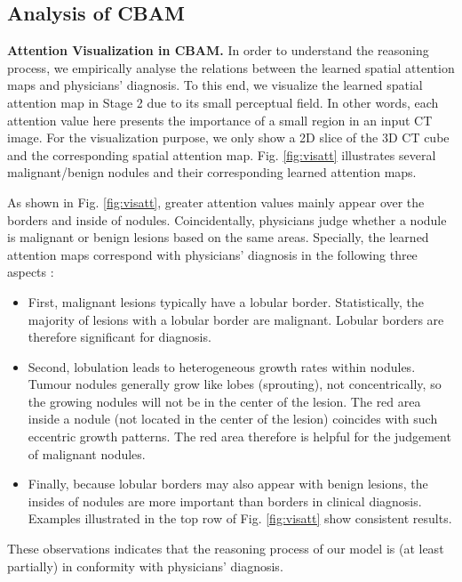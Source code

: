 \documentclass[final,5p,times,twocolumn]{elsarticle}
\begin{document}
\subsection{Analysis of CBAM}
\label{ssec:exp_cbam}

\textbf{Attention Visualization in CBAM.} 
In order to understand the reasoning process, we empirically analyse the relations between the learned spatial attention maps and physicians' diagnosis. To this end, we visualize the learned spatial attention map in Stage 2 due to its small perceptual field. In other words, each attention value here presents the importance of a small region in an input CT image. For the visualization purpose, we only show a 2D slice of the 3D CT cube and the corresponding spatial attention map. 
Fig. \ref{fig:visatt} illustrates several malignant/benign nodules and their corresponding learned attention maps. 

As shown in Fig. \ref{fig:visatt}, greater attention values mainly appear over the borders and inside of nodules. Coincidentally, physicians judge whether a nodule is malignant or benign lesions based on the same areas. Specially, the learned attention maps correspond with physicians' diagnosis in the following three aspects \cite{siegelman1986pulmonary}:
\begin{itemize}
\item First, malignant lesions typically have a lobular border. Statistically, the majority of lesions with a lobular border are malignant. Lobular borders are therefore significant for diagnosis.

\item Second, lobulation leads to heterogeneous growth rates within nodules. Tumour nodules generally grow like lobes (sprouting), not concentrically, so the growing nodules will not be in the center of the lesion. The red area inside a nodule (not located in the center of the lesion) coincides with such eccentric growth patterns. The red area therefore is helpful for the judgement of malignant nodules. 

\item Finally, because lobular borders may also appear with benign lesions, the insides of nodules are more important than borders in clinical diagnosis. Examples illustrated in the top row of Fig. \ref{fig:visatt} show consistent results.
\end{itemize}
These observations indicates that the reasoning process of our model is (at least partially) in conformity with physicians' diagnosis.
\end{document}

